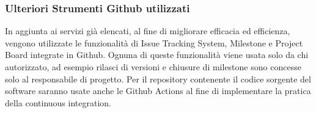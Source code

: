 	\subsubsection{Ulteriori Strumenti Github utilizzati}
		In aggiunta ai servizi già elencati, al fine di migliorare efficacia ed efficienza, vengono utilizzate le funzionalità di Issue Tracking System, Milestone e Project Board integrate in Github. Ognuna di queste funzionalità viene usata solo da chi autorizzato, ad esempio rilasci di versioni e chiusure di milestone sono concesse solo al responsabile di progetto.
		\newline
		Per il repository contenente il codice sorgente del software saranno usate anche le Github Actions al fine di implementare la pratica della continuous integration.
		